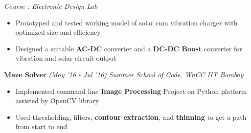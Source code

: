 \documentclass[10 pt]{article}%
\begin{document}
{{{{{{{{{	\vspace{-0.8em}
	{\flushleft \em{Course : Electronic Design Lab}}
	\vspace{-5pt}
	\begin{itemize}[leftmargin=*]
		\setlength\itemsep{1pt}
		\setlength\parskip{1pt}
			\item Prototyped and tested working model of solar cum vibration charger with optimized size and efficiency
			\item Designed a suitable \textbf{AC-DC} converter and a \textbf{DC-DC Boost} converter for vibration and solar circuit output
	\end{itemize}
{\flushleft \textbf {\large{Maze Solver}} \hfill {{{\em{(May '16 - Jul '16)}}}}
	\vspace{-0.8em}
	{\flushleft \em{Summer School of Code, WnCC IIT Bombay}}
	\vspace{-5pt}
	\begin{itemize}[leftmargin=*]
		\setlength\itemsep{1pt}
		\setlength\parskip{1pt}
		\item Implemented command line \textbf{Image Processing} Project on Python platform assisted by OpenCV library
		\item Used thresholding, filters, \textbf{contour extraction}, and \textbf{thinning} to get a path from start to end
	\end{itemize}



}}}}}}}}}}
\end{document}
